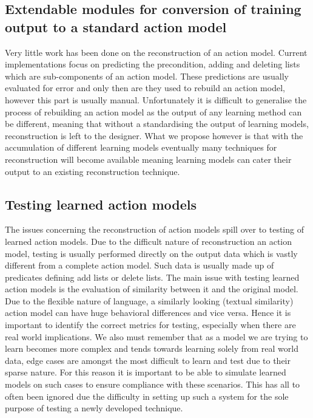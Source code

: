 \subsection{Extendable modules for conversion of training output to a standard action model}
Very little work has been done on the reconstruction of an action model. Current implementations focus on predicting the precondition, adding and deleting lists which are sub-components of an action model. These predictions are usually evaluated for error and only then are they used to rebuild an action model, however this part is usually manual. Unfortunately it is difficult to generalise the process of rebuilding an action model as the output of any learning method can be different, meaning that without a standardising the output of learning models, reconstruction is left to the designer. What we propose however is that with the accumulation of different learning models eventually many techniques for reconstruction will become available meaning learning models can cater their output to an existing reconstruction technique.

\subsection{Testing learned action models}
The issues concerning the reconstruction of action models spill over to testing of learned action models. Due to the difficult nature of reconstruction an action model, testing is usually performed directly on the output data which is vastly different from a complete action model. Such data is usually made up of predicates defining add lists or delete lists. The main issue with testing learned action models is the evaluation of similarity between it and the original model. Due to the flexible nature of language, a similarly looking (textual similarity) action model can have huge behavioral differences and vice versa. Hence it is important to identify the correct metrics for testing, especially when there are real world implications. We also must remember that as a model we are trying to learn becomes more complex and tends towards learning solely from real world data, edge cases are amongst the most difficult to learn and test due to their sparse nature. For this reason it is important to be able to simulate learned models on such cases to ensure compliance with these scenarios. This has all to often been ignored due the difficulty in setting up such a system for the sole purpose of testing a newly developed technique.
